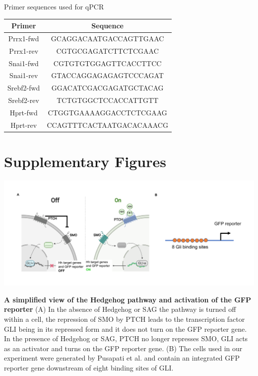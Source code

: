 \begin{supptable}[p!]
\centering
\caption{Primer sequences used for qPCR}
\begin{tabular}{ cc }
\toprule
\textbf{Primer} & \textbf{Sequence} \\
\midrule
Prrx1-fwd & GCAGGACAATGACCAGTTGAAC \\
Prrx1-rev & CGTGCGAGATCTTCTCGAAC \\
Snai1-fwd & CGTGTGTGGAGTTCACCTTCC \\
Snai1-rev & GTACCAGGAGAGAGTCCCAGAT \\
Srebf2-fwd & GGACATCGACGAGATGCTACAG \\
Srebf2-rev & TCTGTGGCTCCACCATTGTT \\
Hprt-fwd & CTGGTGAAAAGGACCTCTCGAAG \\
Hprt-rev & CCAGTTTCACTAATGACACAAACG \\
\bottomrule
\end{tabular}
\label{tab:hh_tableS3}
\end{supptable}

\clearpage
\section{Supplementary Figures}

\begin{suppfigure}[p]  
    \centering
    \includegraphics[width=\linewidth]{figures/hedgehog/SuppFigure1.png}
    \caption[A simplified view of the Hedgehog pathway and activation of the GFP reporter]{
        \textbf{A simplified view of the Hedgehog pathway and activation of the GFP reporter}
        (A) In the absence of Hedgehog or SAG the pathway is turned off within a cell, the repression of SMO by PTCH leads to the transcription factor GLI being in its repressed form and it does not turn on the GFP reporter gene. In the presence of Hedgehog or SAG, PTCH no longer represses SMO, GLI acts as an activator and turns on the GFP reporter gene. (B) The cells used in our experiment were generated by Pusapati et al. and contain an integrated GFP reporter gene downstream of eight binding sites of GLI.  
    }
    \label{fig:hh_figureS1}
\end{suppfigure}


